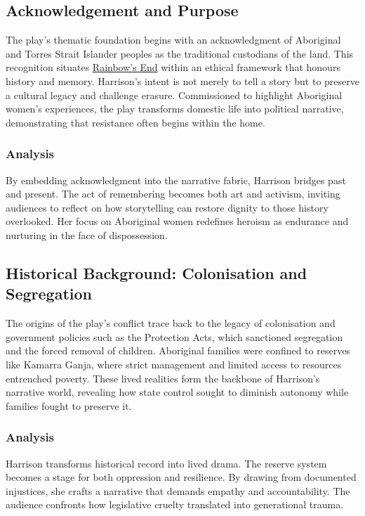 \documentclass[a4paper]{article}
\begin{document}
\subsection{Acknowledgement and Purpose}
The play’s thematic foundation begins with an acknowledgment of Aboriginal and Torres Strait Islander peoples as the traditional custodians of the land. This recognition situates \underline{Rainbow's End} within an ethical framework that honours history and memory. Harrison’s intent is not merely to tell a story but to preserve a cultural legacy and challenge erasure. Commissioned to highlight Aboriginal women’s experiences, the play transforms domestic life into political narrative, demonstrating that resistance often begins within the home.\\

\subsubsection{Analysis}
By embedding acknowledgment into the narrative fabric, Harrison bridges past and present. The act of remembering becomes both art and activism, inviting audiences to reflect on how storytelling can restore dignity to those history overlooked. Her focus on Aboriginal women redefines heroism as endurance and nurturing in the face of dispossession.\\

\subsection{Historical Background: Colonisation and Segregation}
The origins of the play’s conflict trace back to the legacy of colonisation and government policies such as the Protection Acts, which sanctioned segregation and the forced removal of children. Aboriginal families were confined to reserves like Kamarra Ganja, where strict management and limited access to resources entrenched poverty. These lived realities form the backbone of Harrison’s narrative world, revealing how state control sought to diminish autonomy while families fought to preserve it.\\

\subsubsection{Analysis}
Harrison transforms historical record into lived drama. The reserve system becomes a stage for both oppression and resilience. By drawing from documented injustices, she crafts a narrative that demands empathy and accountability. The audience confronts how legislative cruelty translated into generational trauma.\\
\end{document}
